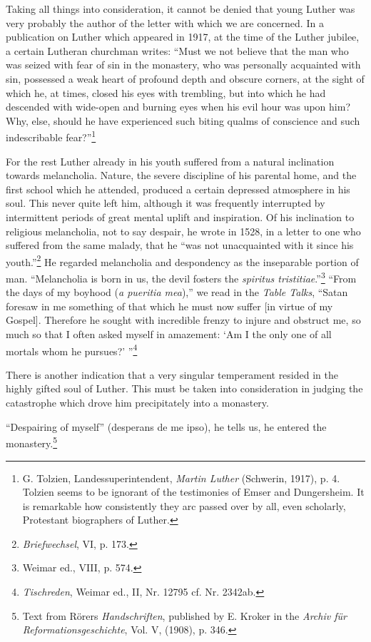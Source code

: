 Taking all things into consideration, it cannot be denied that
young Luther was very probably the author of the letter with which
we are concerned. In a publication on Luther which appeared in
1917, at the time of the Luther jubilee, a certain Lutheran churchman
writes: “Must we not believe that the man who was seized with fear
of sin in the monastery, who was personally acquainted with sin,
possessed a weak heart of profound depth and obscure corners, at
the sight of which he, at times, closed his eyes with trembling, but
into which he had descended with wide-open and burning eyes when
his evil hour was upon him? Why, else, should he have experienced
such biting qualms of conscience and such indescribable fear?”\footnote
{G. Tolzien, Landessuperintendent, \textit{Martin Luther} (Schwerin, 1917), p. 4. Tolzien
seems to be ignorant of the testimonies of Emser and Dungersheim. It is remarkable how
consistently they arc passed over by all, even scholarly, Protestant biographers of Luther.}

For the rest Luther already in his youth suffered from a natural inclination
towards melancholia. Nature, the severe discipline of his parental
home, and the first school which he attended, produced a certain
depressed atmosphere in his soul. This never quite left him, although
it was frequently interrupted by intermittent periods of great mental
uplift and inspiration. Of his inclination to religious melancholia,
not to say despair, he wrote in 1528, in a letter to one who suffered
from the same malady, that he “was not unacquainted with it since
his youth.”\footnote{\textit{Briefwechsel}, VI, p. 173.}
He regarded melancholia and despondency as the
inseparable portion of man. “Melancholia is born in us, the devil
fosters the \textit{spiritus tristitiae}.”\footnote{Weimar ed., VIII, p. 574.}
“From the days of my boyhood (\textit{a pueritia mea}),”
we read in the \textit{Table Talks}, “Satan foresaw in me something
of that which he must now suffer [in virtue of my Gospel].
Therefore he sought with incredible frenzy to injure and obstruct
me, so much so that I often asked myself in amazement: `Am I the
only one of all mortals whom he pursues?' ''\footnote{\textit{Tischreden}, Weimar ed., II, Nr. 12795 cf. Nr. 2342ab.}

There is another indication that a very singular temperament
resided in the highly gifted soul of Luther. This must be taken into
consideration in judging the catastrophe which drove him precipitately into a monastery.

“Despairing of myself” (desperans de me ipso), he tells us, he
entered the monastery.\footnote
{Text from Rörers \textit{Handschriften}, published by E. Kroker in the \textit{Archiv für Reformationsgeschichte}, Vol. V, (1908), p. 346.}

